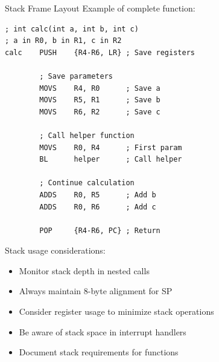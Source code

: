 \begin{example2}{Stack Frame Layout}
Example of complete function:
\begin{lstlisting}[language=armasm, style=base]
; int calc(int a, int b, int c)
; a in R0, b in R1, c in R2
calc    PUSH    {R4-R6, LR} ; Save registers
        
        ; Save parameters
        MOVS    R4, R0      ; Save a
        MOVS    R5, R1      ; Save b
        MOVS    R6, R2      ; Save c
        
        ; Call helper function
        MOVS    R0, R4      ; First param
        BL      helper      ; Call helper
        
        ; Continue calculation
        ADDS    R0, R5      ; Add b
        ADDS    R0, R6      ; Add c
        
        POP     {R4-R6, PC} ; Return
\end{lstlisting}
\end{example2}

\begin{remark}
Stack usage considerations:
\begin{itemize}
  \item Monitor stack depth in nested calls
  \item Always maintain 8-byte alignment for SP
  \item Consider register usage to minimize stack operations
  \item Be aware of stack space in interrupt handlers
  \item Document stack requirements for functions
\end{itemize}
\end{remark}